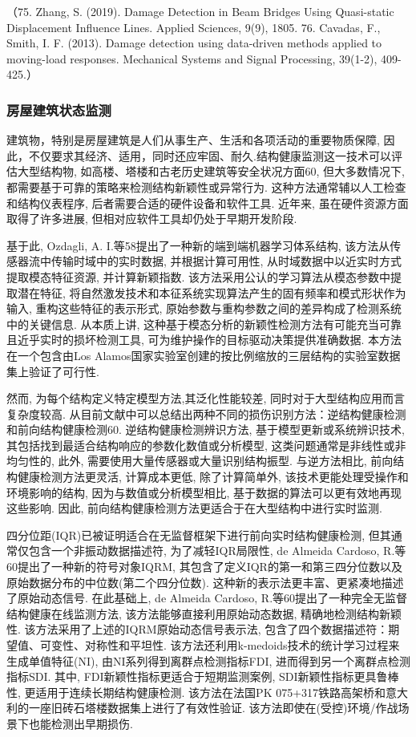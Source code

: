 \documentclass{Style/aas}
\begin{document}
\begin{multicols}{2}
  （75.	Zhang, S. (2019). Damage Detection in Beam Bridges Using Quasi-static Displacement Influence Lines. Applied Sciences, 9(9), 1805.
  76.	Cavadas, F., Smith, I. F. (2013). Damage detection using data-driven methods applied to moving-load responses. Mechanical Systems and Signal Processing, 39(1-2), 409-425.）

  \subsubsection{房屋建筑状态监测}
  建筑物，特别是房屋建筑是人们从事生产、生活和各项活动的重要物质保障, 因此，不仅要求其经济、适用，同时还应牢固、耐久.结构健康监测这一技术可以评估大型结构物, 如高楼、塔楼和古老历史建筑等安全状况方面60, 但大多数情况下, 都需要基于可靠的策略来检测结构新颖性或异常行为. 这种方法通常辅以人工检查和结构仪表程序, 后者需要合适的硬件设备和软件工具. 近年来, 虽在硬件资源方面取得了许多进展, 但相对应软件工具却仍处于早期开发阶段.

  基于此,  Ozdagli, A. I.等58提出了一种新的端到端机器学习体系结构, 该方法从传感器流中传输时域中的实时数据, 并根据计算可用性, 从时域数据中以近实时方式提取模态特征资源, 并计算新颖指数. 该方法采用公认的学习算法从模态参数中提取潜在特征, 将自然激发技术和本征系统实现算法产生的固有频率和模式形状作为输入, 重构这些特征的表示形式, 原始参数与重构参数之间的差异构成了检测系统中的关键信息. 从本质上讲, 这种基于模态分析的新颖性检测方法有可能充当可靠且近乎实时的损坏检测工具, 可为维护操作的目标驱动决策提供准确数据. 本方法在一个包含由Los Alamos国家实验室创建的按比例缩放的三层结构的实验室数据集上验证了可行性.

  然而, 为每个结构定义特定模型方法,其泛化性能较差, 同时对于大型结构应用而言复杂度较高. 从目前文献中可以总结出两种不同的损伤识别方法：逆结构健康检测和前向结构健康检测60. 逆结构健康检测辨识方法, 基于模型更新或系统辨识技术, 其包括找到最适合结构响应的参数化数值或分析模型, 这类问题通常是非线性或非均匀性的, 此外, 需要使用大量传感器或大量识别结构振型. 与逆方法相比, 前向结构健康检测方法更灵活, 计算成本更低, 除了计算简单外, 该技术更能处理受操作和环境影响的结构, 因为与数值或分析模型相比, 基于数据的算法可以更有效地再现这些影响. 因此, 前向结构健康检测方法更适合于在大型结构中进行实时监测.

  四分位距(IQR)已被证明适合在无监督框架下进行前向实时结构健康检测, 但其通常仅包含一个非振动数据描述符, 为了减轻IQR局限性,  de Almeida Cardoso, R.等60提出了一种新的符号对象IQRM, 其包含了定义IQR的第一和第三四分位数以及原始数据分布的中位数(第二个四分位数). 这种新的表示法更丰富、更紧凑地描述了原始动态信号. 在此基础上, de Almeida Cardoso, R.等60提出了一种完全无监督结构健康在线监测方法, 该方法能够直接利用原始动态数据, 精确地检测结构新颖性. 该方法采用了上述的IQRM原始动态信号表示法, 包含了四个数据描述符：期望值、可变性、对称性和平坦性. 该方法还利用k-medoids技术的统计学习过程来生成单值特征(NI), 由NI系列得到离群点检测指标FDI, 进而得到另一个离群点检测指标SDI. 其中, FDI新颖性指标更适合于短期监测案例, SDI新颖性指标更具鲁棒性, 更适用于连续长期结构健康检测. 该方法在法国PK 075+317铁路高架桥和意大利的一座旧砖石塔楼数据集上进行了有效性验证. 该方法即使在(受控)环境/作战场景下也能检测出早期损伤.


\end{multicols}
\end{document}
